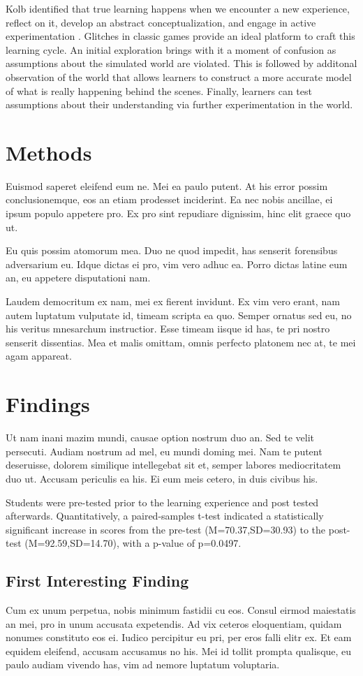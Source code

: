 \documentclass[letterpaper]{article}
\begin{document}
Kolb identified that true learning happens when we encounter a new experience, reflect on it, develop an abstract conceptualization, and engage in active experimentation \cite{kolb84}. Glitches in classic games provide an ideal platform to craft this learning cycle. An initial exploration brings with it a moment of confusion as assumptions about the simulated world are violated. This is followed by additonal observation of the world that allows learners to construct a more accurate model of what is really happening behind the scenes. Finally, learners can test assumptions about their understanding via further experimentation in the world.

\section{Methods}
Euismod saperet eleifend eum ne. Mei ea paulo putent. At his error possim conclusionemque, eos an etiam prodesset inciderint. Ea nec nobis ancillae, ei ipsum populo appetere pro. Ex pro sint repudiare dignissim, hinc elit graece quo ut.

Eu quis possim atomorum mea. Duo ne quod impedit, has senserit forensibus adversarium eu. Idque dictas ei pro, vim vero adhuc ea. Porro dictas latine eum an, eu appetere disputationi nam.

Laudem democritum ex nam, mei ex fierent invidunt. Ex vim vero erant, nam autem luptatum vulputate id, timeam scripta ea quo. Semper ornatus sed eu, no his veritus mnesarchum instructior. Esse timeam iisque id has, te pri nostro senserit dissentias. Mea et malis omittam, omnis perfecto platonem nec at, te mei agam appareat.

\section{Findings}
Ut nam inani mazim mundi, causae option nostrum duo an. Sed te velit persecuti. Audiam nostrum ad mel, eu mundi doming mei. Nam te putent deseruisse, dolorem similique intellegebat sit et, semper labores mediocritatem duo ut. Accusam periculis ea his. Ei eum meis cetero, in duis civibus his.

Students were pre-tested prior to the learning experience and post tested afterwards. Quantitatively, a paired-samples t-test indicated a statistically significant increase in scores from the pre-test (M=70.37,SD=30.93) to the post-test (M=92.59,SD=14.70), with a p-value of p=0.0497.

\subsection{First Interesting Finding}
Cum ex unum perpetua, nobis minimum fastidii cu eos. Consul eirmod maiestatis an mei, pro in unum accusata expetendis. Ad vix ceteros eloquentiam, quidam nonumes constituto eos ei. Iudico percipitur eu pri, per eros falli elitr ex. Et eam equidem eleifend, accusam accusamus no his. Mei id tollit prompta qualisque, eu paulo audiam vivendo has, vim ad nemore luptatum voluptaria.
\end{document}
